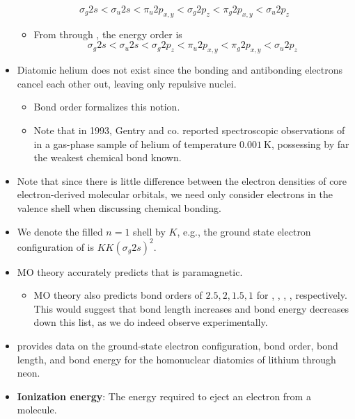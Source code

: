 \documentclass[../notes.tex]{subfiles}
\begin{document}
\begin{itemize}
\begin{equation*}
        \sigma_g2s < \sigma_u2s
        < \pi_u2p_{x,y}
        < \sigma_g2p_z
        < \pi_g2p_{x,y}
        < \sigma_u2p_z
    \end{equation*}
    \begin{itemize}
        \item From  through , the energy order is
        \begin{equation*}
            \sigma_g2s < \sigma_u2s
            < \sigma_g2p_z
            < \pi_u2p_{x,y}
            < \pi_g2p_{x,y}
            < \sigma_u2p_z
        \end{equation*}
    \end{itemize}
    \item Diatomic helium does not exist since the bonding and antibonding electrons cancel each other out, leaving only repulsive nuclei.
    \begin{itemize}
        \item Bond order formalizes this notion.
        \item Note that in 1993, Gentry and co. reported spectroscopic observations of  in a gas-phase sample of helium of temperature $\SI{0.001}{\kelvin}$, possessing by far the weakest chemical bond known.
    \end{itemize}
    \item Note that since there is little difference between the electron densities of core electron-derived molecular orbitals, we need only consider electrons in the valence shell when discussing chemical bonding.
    \item We denote the filled $n=1$ shell by $K$, e.g., the ground state electron configuration of  is $KK(\sigma_g2s)^2$.
    \item MO theory accurately predicts that  is paramagnetic.
    \begin{itemize}
        \item MO theory also predicts bond orders of $2.5,2,1.5,1$ for , , , , respectively. This would suggest that bond length increases and bond energy decreases down this list, as we do indeed observe experimentally.
    \end{itemize}
    \item \textcite{bib:McQuarrieSimon} provides data on the ground-state electron configuration, bond order, bond length, and bond energy for the homonuclear diatomics of lithium through neon.
    \item \textbf{Ionization energy}: The energy required to eject an electron from a molecule.

\end{itemize}
\end{document}
